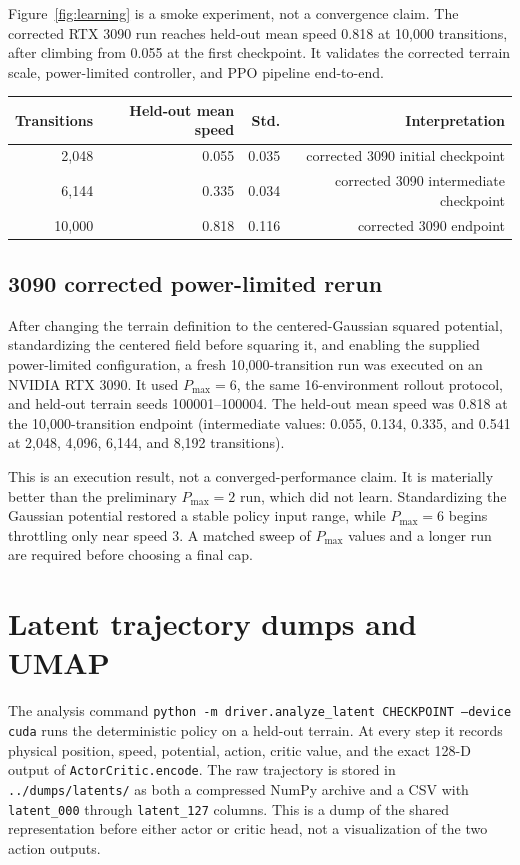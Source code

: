\documentclass[10pt]{article}
\newcommand{\code}[1]{\texttt{#1}}
\begin{document}
Figure~\ref{fig:learning} is a smoke experiment, not a convergence claim. The
corrected RTX 3090 run reaches held-out mean speed 0.818 at 10,000 transitions,
after climbing from 0.055 at the first checkpoint. It validates the corrected
terrain scale, power-limited controller, and PPO pipeline end-to-end.

\begin{center}
\begin{tabular}{rrrr}
\toprule
\textbf{Transitions} & \textbf{Held-out mean speed} & \textbf{Std.} & \textbf{Interpretation}\\
\midrule
2,048 & 0.055 & 0.035 & corrected 3090 initial checkpoint\\
6,144 & 0.335 & 0.034 & corrected 3090 intermediate checkpoint\\
10,000 & 0.818 & 0.116 & corrected 3090 endpoint\\
\bottomrule
\end{tabular}
\end{center}

\subsection{3090 corrected power-limited rerun}
After changing the terrain definition to the centered-Gaussian squared potential,
standardizing the centered field before squaring it, and enabling the supplied
power-limited configuration, a fresh 10,000-transition run was executed on an
NVIDIA RTX 3090. It used $P_{\max}=6$, the same 16-environment
rollout protocol, and held-out terrain seeds 100001--100004. The held-out mean
speed was 0.818 at the 10,000-transition endpoint (intermediate values: 0.055,
0.134, 0.335, and 0.541 at 2,048, 4,096, 6,144, and 8,192 transitions).

This is an execution result, not a converged-performance claim. It is materially
better than the preliminary $P_{\max}=2$ run, which did not learn. Standardizing
the Gaussian potential restored a stable policy input range, while $P_{\max}=6$
begins throttling only near speed 3. A matched sweep of $P_{\max}$ values and a
longer run are required before choosing a final cap.

\section{Latent trajectory dumps and UMAP}
The analysis command \code{python -m driver.analyze\_latent CHECKPOINT --device cuda}
runs the deterministic policy on a held-out terrain. At every step it records
physical position, speed, potential, action, critic value, and the exact
128-D output of \code{ActorCritic.encode}. The raw trajectory is stored in
\code{../dumps/latents/} as both a compressed NumPy archive and a CSV with
\code{latent\_000} through \code{latent\_127} columns. This is a dump of the
shared representation before either actor or critic head, not a visualization
of the two action outputs.
\end{document}
